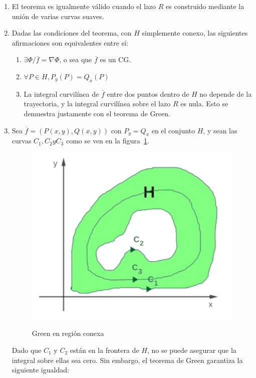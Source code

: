 \documentclass{article}
\begin{document}
\begin{enumerate}
\item El teorema es igualmente válido cuando el lazo $R$ es construido mediante la unión de varias curvas suaves.

\item Dadas las condiciones del teorema, con $H$ simplemente conexo, las siguientes afirmaciones son equivalentes entre sí:
\begin{enumerate}
\item $\exists \Phi / \overline{f} = \nabla \Phi$, o sea que $\overline{f}$ es un CG.
\item $\forall P \in H, P_y(P) = Q_x(P)$
\item La integral curvilínea de $\overline{f}$ entre dos puntos dentro de $H$ no depende de la trayectoria, y la integral curvilínea sobre el lazo $R$ es nula. Esto se demuestra justamente con el teorema de Green.
\end{enumerate}

\item Sea $\overline{f} = (P(x,y), Q(x,y))$ con $P_y = Q_x$ en el conjunto $H$, y sean las curvas $C_1, C_2 y C_3$ como se ven en la figura~\ref{fig:green31}.

\begin{figure}[ht]
\centering
\caption{Green en región conexa}
\includegraphics[scale=0.85]{img/teo_fig031_green.png}
\label{fig:green31}
\end{figure}

Dado que $C_1$ y $C_2$ están en la frontera de $H$, no se puede asegurar que la integral sobre ellas sea cero. Sin embargo, el teorema de Green garantiza la siguiente igualdad:


\end{enumerate}
\end{document}
